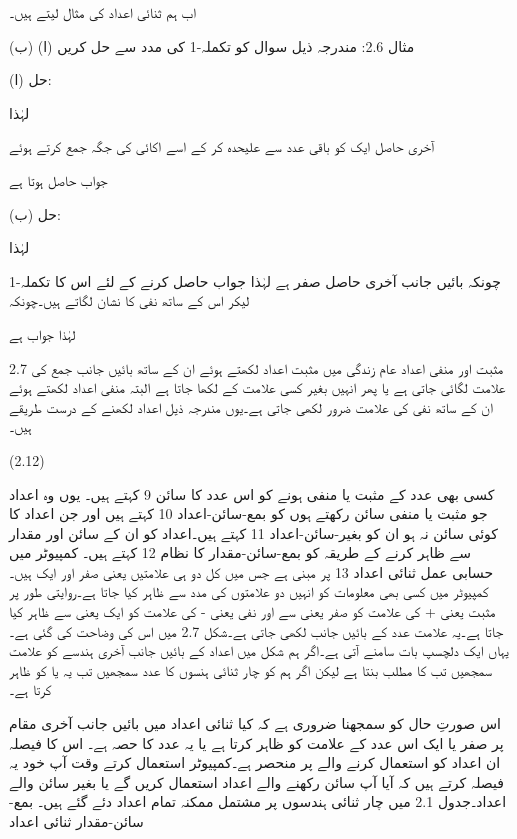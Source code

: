 	اب ہم ثنائی اعداد کی مثال لیتے ہیں۔

مثال 2.6: مندرجہ ذیل سوال کو تکملہ-1  کی مدد سے حل کریں
(ا) 
(ب) 

حل (ا):

لہٰذا
 
آخری حاصل ایک کو باقی عدد سے علیحدہ کر کے اسے اکائی  کی جگہ جمع کرتے ہوئے

جواب حاصل ہوتا ہے 

حل (ب):

لہٰذا

چونکہ بائیں جانب آخری حاصل صفر ہے لہٰذا جواب حاصل کرنے کے لئے اس  کا تکملہ-1 لیکر اس کے ساتھ نفی کا نشان لگاتے ہیں۔چونکہ

لہٰذا جواب ہے
 
2.7 مثبت اور منفی اعداد
	عام زندگی میں مثبت اعداد لکھتے ہوئے ان کے ساتھ بائیں جانب  جمع کی علامت لگائی جاتی ہے یا پھر انہیں بغیر کسی علامت کے لکھا جاتا ہے البتہ منفی اعداد لکھتے ہوئے ان کے ساتھ نفی کی علامت ضرور لکھی جاتی ہے۔یوں مندرجہ ذیل اعداد لکھنے کے درست طریقے ہیں۔

 
(2.12)

	کسی بھی عدد کے مثبت یا منفی ہونے کو اس عدد کا سائن 9 کہتے ہیں۔ یوں وہ اعداد جو مثبت یا منفی سائن رکھتے ہوں کو بمع-سائن-اعداد 10 کہتے ہیں اور جن اعداد کا کوئی سائن  نہ ہو ان کو بغیر-سائن-اعداد 11 کہتے ہیں۔اعداد کو ان کے سائن  اور مقدار سے ظاہر کرنے کے طریقہ کو بمع-سائن-مقدار کا نظام 12 کہتے ہیں۔ 
	کمپیوٹر میں حسابی عمل ثنائی اعداد 13 پر مبنی ہے جس میں کل دو ہی علامتیں یعنی صفر اور ایک ہیں۔کمپیوٹر میں کسی بھی معلومات کو انہیں دو علامتوں کی مدد سے ظاہر کیا جاتا ہے۔روایتی طور پر مثبت یعنی + کی علامت کو صفر یعنی  سے اور نفی یعنی -  کی علامت کو ایک یعنی  سے ظاہر کیا جاتا ہے۔یہ علامت عدد کے بائیں جانب لکھی جاتی ہے۔شکل 2.7 میں اس کی وضاحت کی گئی ہے۔
	یہاں ایک دلچسپ بات سامنے آتی ہے۔اگر ہم شکل میں اعداد کے بائیں جانب آخری ہندسے کو علامت سمجھیں تب  کا مطلب بنتا ہے لیکن اگر ہم کو چار ثنائی ہنسوں کا عدد سمجھیں تب یہ یا کو ظاہر کرتا ہے۔

	اس صورتِ حال کو سمجھنا ضروری ہے کہ کیا ثنائی اعداد میں بائیں جانب آخری مقام پر صفر  یا ایک  اس عدد کے علامت کو ظاہر کرتا ہے یا یہ عدد کا حصہ ہے۔ اس کا فیصلہ ان اعداد کو استعمال کرنے والے پر منحصر ہے۔کمپیوٹر استعمال کرتے وقت آپ خود یہ فیصلہ کرتے ہیں کہ آیا آپ سائن  رکھنے والے اعداد استعمال کریں گے یا بغیر سائن والے اعداد۔جدول 2.1 میں چار ثنائی ہندسوں پر مشتمل ممکنہ تمام اعداد دئے گئے ہیں۔
بمع-سائن-مقدار
ثنائی اعداد
































